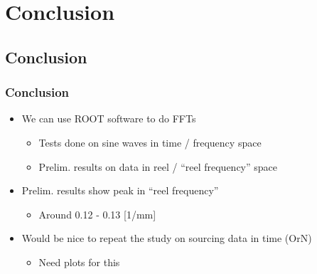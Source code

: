 \documentclass[bigger]{beamer}
\begin{document}
\section{Conclusion}
\label{sec-4}
\subsection{Conclusion}
\label{sec-4-1}
\begin{frame}
\frametitle{Conclusion}
\label{sec-4-1-1}
\begin{itemize}

\item We can use ROOT software to do FFTs
\label{sec-4-1-1-1}%
\begin{itemize}

\item Tests done on sine waves in time / frequency space
\label{sec-4-1-1-1-1}%

\item Prelim. results on data in reel / ``reel frequency'' space
\label{sec-4-1-1-1-2}%
\end{itemize} %

\item Prelim. results show peak in ``reel frequency''
\label{sec-4-1-1-2}%
\begin{itemize}

\item Around 0.12 - 0.13 [1/mm]
\label{sec-4-1-1-2-1}%
\end{itemize} %

\item Would be nice to repeat the study on sourcing data in time (OrN)
\label{sec-4-1-1-3}%
\begin{itemize}

\item Need plots for this
\label{sec-4-1-1-3-1}%
\end{itemize} %
\end{itemize} %
\end{frame}
\end{document}
